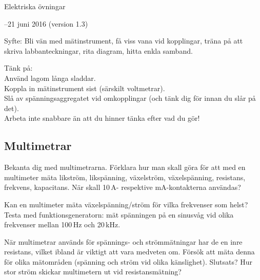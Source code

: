 \documentclass[a4paper,11pt]{article}
\begin{document}
\begin{center}
 {\sf \LARGE Elektriska övningar}
\end{center}


\begin{center}
 {--21 juni 2016 (version 1.3)}
\end{center}

\vspace{5mm} 


Syfte: Bli vän med mätinstrument, få viss vana vid kopplingar, träna 
på att skriva labbanteckningar, rita diagram, hitta enkla samband. 
 
{\sf  Tänk på:\\
Använd lagom långa sladdar.\\
Koppla in mätinstrument sist (särskilt voltmetrar).\\
Slå av spänningsaggregatet vid omkopplingar (och tänk dig för innan 
du slår på det).\\
Arbeta inte snabbare än att du hinner tänka efter vad du gör!}

\subsection*{Multimetrar}

Bekanta dig med multimetrarna.  Förklara
hur man skall göra för att med en multimeter mäta likström,
likspänning, växelström, växelspänning, resistans, 
frekvens, kapacitans. När skall 10\,A- respektive mA-kontakterna 
användas?



Kan en multimeter mäta växelspänning/ström för vilka frekvenser som 
helst? Testa med funktionsgeneratorn: mät spänningen på en sinusvåg vid olika
frekvenser mellan 100\,Hz och 20\,kHz.

När multimetrar används för spännings- och strömmätningar
har de en inre resistans, vilket ibland är viktigt att vara medveten
om. Försök att mäta denna för olika mätområden (spänning och ström vid olika
känslighet). Slutsats? Hur stor ström skickar multimetern ut vid
resistansmätning? 
\end{document}
